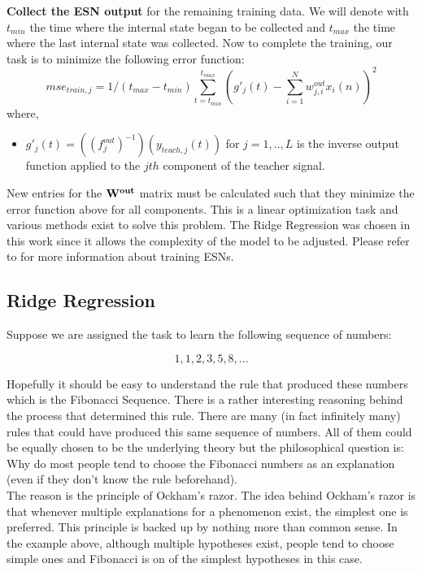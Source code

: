 \documentclass[letterpaper,9pt]{article}
\begin{document}
{\bf Collect the ESN output} for the remaining training data. We will denote with $t_{min}$ the time where the internal state began to be collected and $t_{max}$ the time where the last internal state was collected. Now to complete the training, our task is to minimize the following error function:
\[
mse_{train,j} = 1/(t_{max}-t_{min})\sum_{t=t_{min}}^{t_{max}}(g'_j(t) - \sum_{i=1}^{N}w_{j,i}^{out}x_i(n))^2
\]
where, 
\begin{itemize}
  \item $g'_j(t)=((f_j^{out})^{-1})(y_{teach,j}(t))$ for $j=1,..,L$ is the inverse output function applied to the $jth$ component of the teacher signal. 
\end{itemize}

New entries for the ${\bf W^{out}}$ matrix must be calculated such that they minimize the error function above for all components. This is a linear optimization task and various methods exist to solve this problem. The Ridge Regression was chosen in this work since it allows the complexity of the model to be adjusted. Please refer to \cite{JaegerESNTutorial} for more information about training ESNs.

\subsection{Ridge Regression}

Suppose we are assigned the task to learn the following sequence of numbers:

\[
  1,1,2,3,5,8,...
\]

Hopefully it should be easy to understand the rule that produced these numbers which is the Fibonacci Sequence. There is a rather interesting reasoning behind the process that determined this rule. There are many (in fact infinitely many) rules that could have produced this same sequence of numbers. All of them could be equally chosen to be the underlying theory but the philosophical question is: Why do most people tend to choose the Fibonacci numbers as an explanation (even if they don't know the rule beforehand).\\

The reason is the principle of Ockham's razor. The idea behind Ockham's razor is that whenever multiple explanations for a phenomenon exist, the simplest one is preferred. This principle is backed up by nothing more than common sense. In the example above, although multiple hypotheses exist, people tend to choose simple ones and Fibonacci is on of the simplest hypotheses in this case.\\
\end{document}
